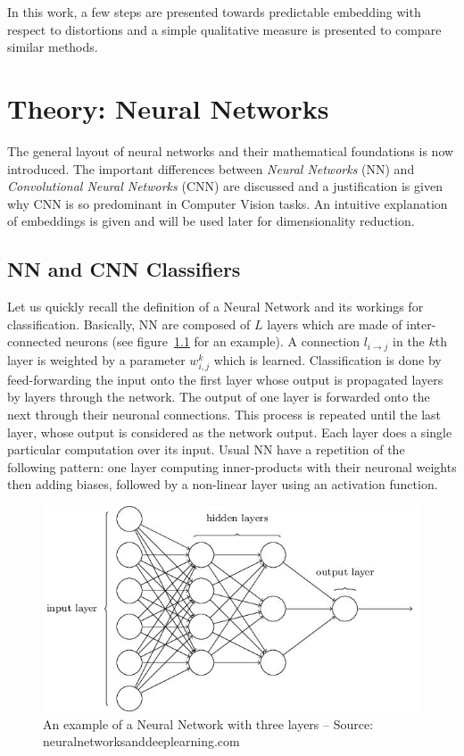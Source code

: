 \documentclass[a4paper,12pt]{report}
\begin{document}
In this work, a few steps are presented towards predictable embedding with respect to distortions and a simple qualitative measure is presented to compare similar methods.


\chapter{Theory: Neural Networks}
\label{chap:neural_network}
The general layout of neural networks and their mathematical foundations is now introduced.
The important differences between {\em Neural Networks} (NN) and {\em Convolutional Neural Networks} (CNN) are discussed and a justification is given why CNN is so predominant in Computer Vision tasks.
An intuitive explanation of embeddings is given and will be used later for dimensionality reduction.

\section{NN and CNN Classifiers}

Let us quickly recall the definition of a Neural Network and its workings for classification.
Basically, NN are composed of $L$ layers which are made of inter-connected neurons (see figure~\ref{fig:neural_network} for an example).
A connection $l_{i \rightarrow j}$ in the $k$th layer is weighted by a parameter $w^k_{i,j}$ which is learned.
Classification is done by feed-forwarding the input onto the first layer whose output is propagated layers by layers through the network.
The output of one layer is forwarded onto the next through their neuronal connections.
This process is repeated until the last layer, whose output is considered as the network output.
Each layer does a single particular computation over its input.
Usual NN have a repetition of the following pattern: one layer computing inner-products with their neuronal weights then adding biases, followed by a non-linear layer using an activation function.

\begin{figure}[t]
    \begin{center}
        \includegraphics{thesis_figures/NN.jpg}
    \end{center}
    \caption{An example of a Neural Network with three layers -- Source: neuralnetworksanddeeplearning.com}
    \label{fig:neural_network}
\end{figure}
\end{document}
